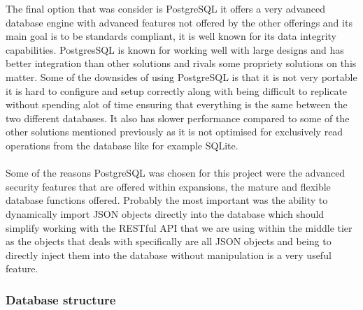 The final option that was consider is PostgreSQL it offers a very advanced database engine with advanced features not offered by the other offerings and its main goal is to be standards compliant, it is well known for its data integrity capabilities. PostgresSQL is known for working well with large designs and has better integration than other solutions and rivals some propriety solutions on this matter. Some of the downsides of using PostgreSQL is that it is not very portable it is hard to configure and setup correctly along with being difficult to replicate without spending alot of time ensuring that everything is the same between the two different databases. It also has slower performance compared to some of the other solutions mentioned previously as it is not optimised for exclusively read operations from the database like for example SQLite.\\
\\
Some of the reasons PostgreSQL was chosen for this project were the advanced security features that are offered within expansions, the mature and flexible database functions offered. Probably the most important was the ability to dynamically import JSON objects directly into the database which should simplify working with the RESTful API that we are using within the middle tier as the objects that deals with specifically are all JSON objects and being to directly inject them into the database without manipulation is a very useful feature. 

\subsubsection*{Database structure}
\label{sec:database_strucutre}

